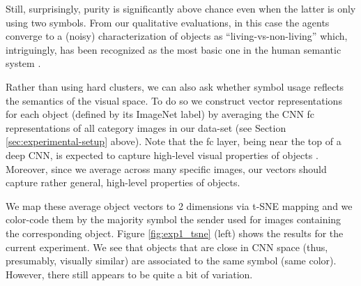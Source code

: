 Still, surprisingly, purity is
significantly above chance even when the latter is only using two
symbols. From our qualitative evaluations, in this case the agents converge to a
(noisy) characterization of objects as ``living-vs-non-living'' which, intriguingly, has been recognized as the most basic one in the human semantic system \citep{Caramazza:Shelton:1998}.

Rather than using hard clusters, we can also ask whether symbol usage reflects the semantics of the visual space. To do so we construct vector representations for each object (defined by its ImageNet label) by
averaging the CNN fc representations of all category images in our
data-set (see Section \ref{sec:experimental-setup} above).  Note that the fc layer, being near the top of a deep CNN, is expected to capture high-level visual properties of objects
\citep{Zeiler:Fergus:2014}. Moreover, since we average across many
specific images, our vectors should capture rather general, high-level
properties of objects. 

We map these average object vectors to 2
dimensions via t-SNE mapping \citep{Laurens:Hinton:2008} and we
color-code them by the majority symbol the sender used for images
containing the corresponding object. Figure
\ref{fig:exp1_tsne} (left) shows the results for the current experiment. We see that objects that
are close in CNN space (thus, presumably, visually similar) are
associated to the same symbol (same color). However, there still appears to be quite a bit of variation.


